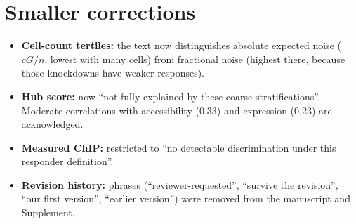 \documentclass[10pt]{article}
\begin{document}
\section*{Smaller corrections}
\begin{itemize}
\item \textbf{Cell-count tertiles:} the text now distinguishes absolute expected noise ($cG/n$, lowest with many cells) from fractional noise (highest there, because those knockdowns have weaker responses).
\item \textbf{Hub score:} now ``not fully explained by these coarse stratifications''. Moderate correlations with accessibility (0.33) and expression (0.23) are acknowledged.
\item \textbf{Measured ChIP:} restricted to ``no detectable discrimination under this responder definition''.
\item \textbf{Revision history:} phrases (``reviewer-requested'', ``survive the revision'', ``our first version'', ``earlier version'') were removed from the manuscript and Supplement.
\end{itemize}
\end{document}
